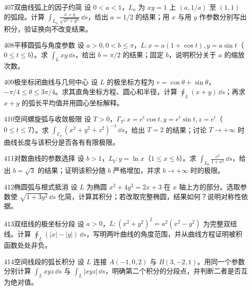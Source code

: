\begin{exercise}{407}{双曲线弧上的因子约简}
设 $0<a<1$，$L_a$ 为 $xy=1$ 上 $(a,1/a)$ 至 $(1,1)$ 的弧段。计算 $\int_{L_a}\frac{x+y}{\sqrt{x^2+y^2}}\,\dd s$，给出 $a=1/2$ 的结果；用 $x$ 与用 $y$ 作参数分别写出积分，验证换向不改变结果。
\end{exercise}

\begin{exercise}{408}{平移圆弧与角度参数}
设 $a>0,0<b\leq\pi$，$L:x=a(1+\cos t),y=a\sin t$（$0\leq t\leq b$）。求 $\int_Lxy\,\dd s$，给出 $b=\pi/2$ 的结果；固定 $b$，说明积分关于 $a$ 的缩放次数。
\end{exercise}

\begin{exercise}{409}{极坐标闭曲线与几何中心}
设 $L$ 的极坐标方程为 $r=\cos\theta+\sin\theta$，$-\pi/4\leq\theta\leq3\pi/4$。求其直角坐标方程、圆心和半径，计算 $\oint_L(x+y)\,\dd s$；再求 $x+y$ 的弧长平均值并用圆心坐标解释。
\end{exercise}

\begin{exercise}{410}{空间螺旋弧与收敛极限}
设 $T>0$，$\Gamma_T:x=e^t\cos t,y=e^t\sin t,z=e^t$（$0\leq t\leq T$）。求
$\int_{\Gamma_T}(x^2+y^2+z^2)^{-1}\,\dd s$，给出 $T=2$ 的结果；讨论 $T\to+\infty$ 时曲线长度与该积分是否各有有限极限。
\end{exercise}

\begin{exercise}{411}{对数曲线的参数选择}
设 $b>1$，$L_b:y=\ln x$（$1\leq x\leq b$）。求 $\int_{L_b}\frac{e^y}{1+x^2}\,\dd s$，给出 $b=\sqrt3$ 的结果；证明该积分随 $b$ 严格增加，并求 $b\to+\infty$ 时的极限。
\end{exercise}

\begin{exercise}{412}{椭圆弧与根式抵消}
设 $L$ 为椭圆 $x^2+4y^2=2x+3$ 在 $x$ 轴上方的部分。选取参数使 $\sqrt{1+3y^2}\,\dd s$ 化简，计算其积分；若改取完整椭圆，结果如何？说明对称性依据。
\end{exercise}

\begin{exercise}{413}{双纽线的极坐标分段}
设 $a>0$，$L:(x^2+y^2)^2=a^2(x^2-y^2)$ 为完整双纽线。计算 $\oint_L(|x|-|y|)\,\dd s$，写明两叶曲线的角度范围，并从曲线方程证明被积函数处处非负。
\end{exercise}

\begin{exercise}{414}{空间线段的弧长积分}
设 $L$ 连接 $A(-1,0,2)$ 与 $B(3,-2,1)$。用同一个参数分别计算 $\int_Lxyz\,\dd s$ 与 $\int_L|xyz|\,\dd s$，明确第二个积分的分段点，并判断二者是否互为绝对值。
\end{exercise}

